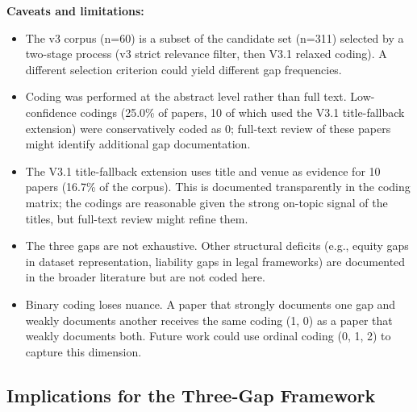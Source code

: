 \textbf{Caveats and limitations:}

\begin{itemize}
  \item The v3 corpus (n=60) is a subset of the candidate set
        (n=311) selected by a two-stage process (v3 strict
        relevance filter, then V3.1 relaxed coding). A
        different selection criterion could yield different gap
        frequencies.

  \item Coding was performed at the abstract level rather
        than full text. Low-confidence codings (25.0\% of
        papers, 10 of which used the V3.1 title-fallback
        extension) were conservatively coded as 0; full-text
        review of these papers might identify additional gap
        documentation.

  \item The V3.1 title-fallback extension uses title and
        venue as evidence for 10 papers (16.7\% of the
        corpus). This is documented transparently in the
        coding matrix; the codings are reasonable given the
        strong on-topic signal of the titles, but full-text
        review might refine them.

  \item The three gaps are not exhaustive. Other structural
        deficits (e.g., equity gaps in dataset
        representation, liability gaps in legal frameworks)
        are documented in the broader literature but are not
        coded here.

  \item Binary coding loses nuance. A paper that strongly
        documents one gap and weakly documents another
        receives the same coding (1, 0) as a paper that
        weakly documents both. Future work could use
        ordinal coding (0, 1, 2) to capture this dimension.
\end{itemize}

\subsection{Implications for the Three-Gap Framework}
\label{sec:implications}

